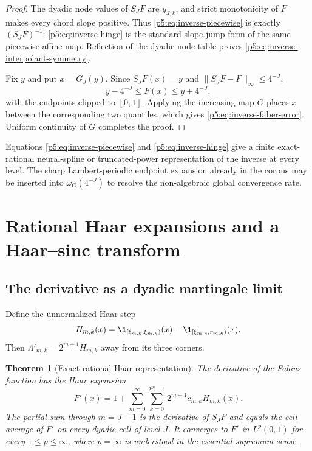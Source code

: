 \documentclass[11pt,oneside]{article}
\newtheorem{theorem}{Theorem}[section]
\theoremstyle{definition}
\begin{document}
\begin{proof}
The dyadic node values of $S_JF$ are $y_{J,k}$, and strict monotonicity of
$F$ makes every chord slope positive.  Thus \eqref{p5:eq:inverse-piecewise} is
exactly $(S_JF)^{-1}$; \eqref{p5:eq:inverse-hinge} is the standard
slope-jump form of the same piecewise-affine map.  Reflection of the dyadic
node table proves \eqref{p5:eq:inverse-interpolant-symmetry}.

Fix $y$ and put $x=G_J(y)$.  Since $S_JF(x)=y$ and
$\|S_JF-F\|_\infty\le4^{-J}$,
\[
 y-4^{-J}\le F(x)\le y+4^{-J},
\]
with the endpoints clipped to $[0,1]$.  Applying the increasing map $G$
places $x$ between the corresponding two quantiles, which gives
\eqref{p5:eq:inverse-faber-error}.  Uniform continuity of $G$ completes the
proof.
\end{proof}

\newresult Equations \eqref{p5:eq:inverse-piecewise} and
\eqref{p5:eq:inverse-hinge} give a finite exact-rational neural-spline or
truncated-power representation of the inverse at every level.  The sharp
Lambert-periodic endpoint expansion already in the corpus may be inserted
into $\omega_G(4^{-J})$ to resolve the non-algebraic global convergence rate.

\section{Rational Haar expansions and a Haar--sinc transform}
\label{p5:sec:haar}

\subsection{The derivative as a dyadic martingale limit}

Define the unnormalized Haar step
\begin{equation}
 H_{m,k}(x)=
 \1_{[\ell_{m,k},\xi_{m,k})}(x)
 -\1_{[\xi_{m,k},r_{m,k})}(x).                           \label{p5:eq:haar-step}
\end{equation}
Then $\Lambda'_{m,k}=2^{m+1}H_{m,k}$ away from its three
corners.

\begin{theorem}[Exact rational Haar representation]
\label{p5:thm:haar-Fprime}
The derivative of the Fabius function has the Haar expansion
\begin{equation}
 \boxed{\displaystyle
 F'(x)=1+\sum_{m=0}^\infty\sum_{k=0}^{2^m-1}
 2^{m+1}c_{m,k}H_{m,k}(x).}                              \label{p5:eq:haar-Fprime}
\end{equation}
The partial sum through $m=J-1$ is the derivative of $S_JF$ and equals the
cell average of $F'$ on every dyadic cell of level $J$.  It converges to
$F'$ in $L^p(0,1)$ for every $1\le p\le\infty$, where $p=\infty$ is
understood in the essential-supremum sense.
\end{theorem}
\end{document}
